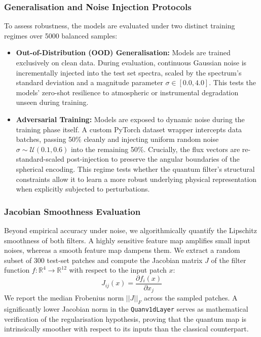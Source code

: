 \subsubsection{Generalisation and Noise Injection Protocols}
\label{sec:exp4_noise}

To assess robustness, the models are evaluated under two distinct training regimes over 5000 balanced samples:
\begin{itemize}
    \item \textbf{Out-of-Distribution (OOD) Generalisation:} Models are trained exclusively on clean data. During evaluation, continuous Gaussian noise is incrementally injected into the test set spectra, scaled by the spectrum's standard deviation and a magnitude parameter $\sigma \in [0.0, 4.0]$. This tests the models' zero-shot resilience to atmospheric or instrumental degradation unseen during training.
    \item \textbf{Adversarial Training:} Models are exposed to dynamic noise during the training phase itself. A custom PyTorch dataset wrapper intercepts data batches, passing 50\% cleanly and injecting uniform random noise $\sigma \sim \mathcal{U}(0.1, 0.6)$ into the remaining 50\%. Crucially, the flux vectors are re-standard-scaled post-injection to preserve the angular boundaries of the spherical encoding. This regime tests whether the quantum filter's structural constraints allow it to learn a more robust underlying physical representation when explicitly subjected to perturbations.
\end{itemize}

\subsubsection{Jacobian Smoothness Evaluation}
\label{sec:exp4_jacobian}

Beyond empirical accuracy under noise, we algorithmically quantify the Lipschitz smoothness of both filters. A highly sensitive feature map amplifies small input noises, whereas a smooth feature map dampens them. We extract a random subset of 300 test-set patches and compute the Jacobian matrix $J$ of the filter function $f: \mathbb{R}^4 \to \mathbb{R}^{12}$ with respect to the input patch $x$:
$$ J_{ij}(x) = \frac{\partial f_i(x)}{\partial x_j} $$
We report the median Frobenius norm $||J||_F$ across the sampled patches. A significantly lower Jacobian norm in the \texttt{Quanv1dLayer} serves as mathematical verification of the regularisation hypothesis, proving that the quantum map is intrinsically smoother with respect to its inputs than the classical counterpart.



